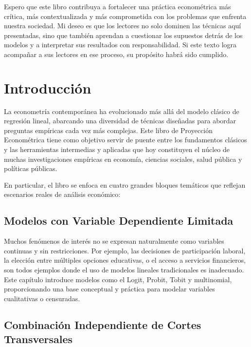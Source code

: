 \documentclass[
  letterpaper,
  DIV=11,
  numbers=noendperiod]{scrreprt}
\begin{document}
Espero que este libro contribuya a fortalecer una práctica econométrica
más crítica, más contextualizada y más comprometida con los problemas
que enfrenta nuestra sociedad. Mi deseo es que los lectores no solo
dominen las técnicas aquí presentadas, sino que también aprendan a
cuestionar los supuestos detrás de los modelos y a interpretar sus
resultados con responsabilidad. Si este texto logra acompañar a sus
lectores en ese proceso, su propósito habrá sido cumplido.


\chapter{Introducción}\label{introducciuxf3n}

La econometría contemporánea ha evolucionado más allá del modelo clásico
de regresión lineal, abarcando una diversidad de técnicas diseñadas para
abordar preguntas empíricas cada vez más complejas. Este libro de
Proyección Econométrica tiene como objetivo servir de puente entre los
fundamentos clásicos y las herramientas intermedias y aplicadas que hoy
constituyen el núcleo de muchas investigaciones empíricas en economía,
ciencias sociales, salud pública y políticas públicas.

En particular, el libro se enfoca en cuatro grandes bloques temáticos
que reflejan escenarios reales de análisis económico:

\section{Modelos con Variable Dependiente
Limitada}\label{modelos-con-variable-dependiente-limitada}

Muchos fenómenos de interés no se expresan naturalmente como variables
continuas y sin restricciones. Por ejemplo, las decisiones de
participación laboral, la elección entre múltiples opciones educativas,
o el acceso a servicios financieros, son todos ejemplos donde el uso de
modelos lineales tradicionales es inadecuado. Este capítulo introduce
modelos como el Logit, Probit, Tobit y multinomial, proporcionando una
base conceptual y práctica para modelar variables cualitativas o
censuradas.

\section{Combinación Independiente de Cortes
Transversales}\label{combinaciuxf3n-independiente-de-cortes-transversales}
\end{document}

